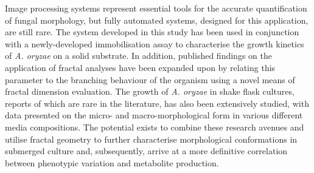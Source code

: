 Image processing systems represent essential tools for the accurate quantification of fungal morphology, but fully automated systems, designed for this application, are still rare. The system developed in this study has been used in conjunction with a newly-developed immobilisation assay to characterise the growth kinetics of \emph{A. oryzae} on a solid substrate. In addition, published findings on the application of fractal analyses have been expanded upon by relating this parameter to the branching behaviour of the organism using a novel means of fractal dimension evaluation. The growth of \emph{A. oryzae} in shake flask cultures, reports of which are rare in the literature, has also been extensively studied, with data presented on the micro- and macro-morphological form in various different media compositions. The potential exists to combine these research avenues and utilise fractal geometry to further characterise morphological conformations in submerged culture and, subsequently, arrive at a more definitive correlation between phenotypic variation and metabolite production.